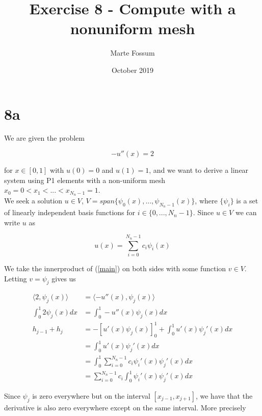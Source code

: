 \documentclass[12pt, a4paper]{article}
\title{Exercise 8 - Compute with a nonuniform mesh}
\date{October 2019}
\author{Marte Fossum}
\begin{document}
\maketitle
\newpage

{\setlength{\parindent}{0cm}

\section*{8a}

We are given the problem

\begin{equation} \label{main}
    -u''(x) = 2
\end{equation}

for \(x \in [0,1]\) with \(u(0) = 0\) and \(u(1) = 1\), and we want to derive a linear system using P1 elements with a non-uniform mesh \(x_{0}=0<x_{1}< {...} <x_{N_{n}-1}=1\). \\

We seek a solution \(u \in V\), \(V = span\{\psi_0(x), ..., \psi_{N_n - 1}(x)\}\), where \(\{\psi_i\}\) is a set of linearly independent basis functions for \(i \in \{0, ..., N_n -1\}\). Since \(u \in V\) we can write \(u\) as 

\begin{equation} \label{u_sum}
    u(x) = \sum_{i = 0}^{N_{n}-1} c_i\psi_i(x)
\end{equation}

We take the innerproduct of (\ref{main}) on both sides with some function \(v \in V\). Letting \(v = \psi_j\) gives us 

\begin{align*}
    \langle 2, \psi_j(x)\rangle &= \langle -u''(x), \psi_j(x)\rangle \\
    \int_{0}^{1} 2\psi_j(x) dx &= \int_{0}^{1} -u''(x)\psi_j(x) dx \\
    h_{j-1} + h_j &= -[u'(x)\psi_j(x)]_0^1 + \int_0^1 u'(x)\psi_j'(x) dx \\
    &= \int_0^1 u'(x)\psi_j'(x) dx \\
    &= \int_0^1 \sum_{i = 0}^{N_n -1} c_i \psi_i'(x)\psi_j'(x) dx \\
    &= \sum_{i = 0}^{N_n - 1} c_i \int_0^1 \psi_i'(x) \psi_j'(x) dx
\end{align*}

Since \(\psi_j\) is zero everywhere but on the interval \([x_{j-1}, x_{j+1}]\), we have that the derivative is also zero everywhere except on the same interval. More precisely 

}
\end{document}
